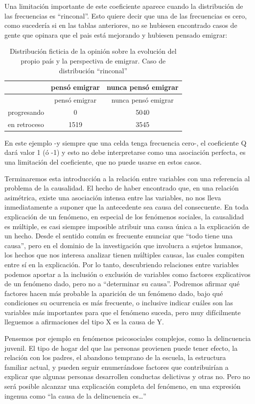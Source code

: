\documentclass[]{book}
\begin{document}
Una limitación importante de este coeficiente aparece cuando la
distribución de las frecuencias es ``rinconal''. Esto quiere decir que una de las frecuencias es cero, como sucedería si en las tablas anteriores, no se hubiesen encontrado casos de gente que opinara que el pais está mejorando y hubiesen pensado emigrar:

\begin{longtable}[]{@{}lcc@{}}
\caption{\label{tab:unnamed-chunk-120}Distribución ficticia de la opinión sobre la evolución del propio país y la perspectiva de emigrar. Caso de distribución ``rinconal''}\tabularnewline
\toprule
& pensó emigrar & nunca pensó emigrar\tabularnewline
\midrule
\endfirsthead
\toprule
& pensó emigrar & nunca pensó emigrar\tabularnewline
\midrule
\endhead
progresando & 0 & 5040\tabularnewline
en retroceso & 1519 & 3545\tabularnewline
\bottomrule
\end{longtable}

En este ejemplo -y siempre que una celda tenga frecuencia cero-, el
coeficiente Q dará valor 1 (ó -1) y esto no debe interpretarse como una asociación perfecta, es una limitación del coeficiente, que no puede usarse en estos casos.

Terminaremos esta introducción a la relación entre variables con una referencia al problema de la causalidad. El hecho de haber encontrado
que, en una relación asimétrica, existe una asociación intensa entre las variables, no nos lleva inmediatamente a suponer que la antecedente sea causa del consecuente. En toda explicación de un fenómeno, en especial de los fenómenos sociales, la causalidad es múltiple, es casi siempre imposible atribuir una causa única a la explicación de un hecho. Desde el sentido común es frecuente enunciar que ``todo tiene una causa'', pero en el dominio de la investigación que involucra a sujetos humanos, los hechos que nos interesa analizar tienen múltiples causas, las cuales compiten entre sí en la explicación. Por lo tanto, descubriendo relaciones entre variables podemos aportar a la inclusión o exclusión de variables como factores explicativos de un fenómeno dado, pero no a ``determinar su causa''. Podremos afirmar qué factores hacen más probable la aparición de un fenómeno dado, bajo qué condiciones su ocurrencia es más frecuente, o inclusive indicar cuáles son las variables más importantes para que el fenómeno suceda, pero muy difícilmente lleguemos a afirmaciones del tipo X es la causa de Y.

Pensemos por ejemplo en fenómenos psicosociales complejos, como la delincuencia juvenil. El tipo de hogar del que las personas provienen
puede tener efecto, la relación con los padres, el abandono temprano de la escuela, la estructura familiar actual, y pueden seguir enumerándose factores que contribuirían a explicar que algunas personas desarrollen conductas delictivas y otras no. Pero no será posible alcanzar una explicación completa del fenómeno, en una expresión ingenua como ``la causa de la delincuencia es\ldots{}''
\end{document}
